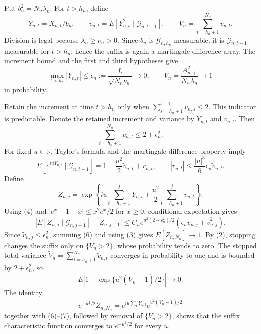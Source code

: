 Put \(b_n^2=N_n\lambda_n\). For \(t>h_n\), define
\[
 Y_{n,t}=X_{n,t}/b_n,\qquad
 v_{n,t}=E[Y_{n,t}^2\mid\mathcal G_{n,t-1}],\qquad
 V_n=\sum_{t=h_n+1}^{N_n}v_{n,t}.
\tag{1}
\]
Division is legal because \(\lambda_n\ge\nu_n>0\). Since \(b_n\) is \(\mathcal G_{n,h_n}\)-measurable, it is \(\mathcal G_{n,t-1}\)-measurable for \(t>h_n\); hence the suffix is again a martingale-difference array. The increment bound and the first and third hypotheses give
\[
 \max_{t>h_n}|Y_{n,t}|
 \le\epsilon_n:=\frac{L}{\sqrt{N_n\nu_n}}\longrightarrow0,
 \qquad V_n=\frac{A_{n,+}^2}{N_n\lambda_n}\longrightarrow1
\tag{2}
\]
in probability.

Retain the increment at time \(t>h_n\) only when \(\sum_{s=h_n+1}^{t-1}v_{n,s}\le2\). This indicator is predictable. Denote the retained increment and variance by \(\widetilde Y_{n,t}\) and \(\widetilde v_{n,t}\). Then
\[
 \sum_{t=h_n+1}^{N_n}\widetilde v_{n,t}\le2+\epsilon_n^2.
\tag{3}
\]
For fixed \(u\in\mathbb R\), Taylor's formula and the martingale-difference property imply
\[
 E[e^{iu\widetilde Y_{n,t}}\mid\mathcal G_{n,t-1}]
 =1-\frac{u^2}{2}\widetilde v_{n,t}+r_{n,t},
 \qquad |r_{n,t}|\le\frac{|u|^3}{6}\epsilon_n\widetilde v_{n,t}.
\tag{4}
\]
Define
\[
 Z_{n,j}=\exp\!\left\{iu\sum_{t=h_n+1}^j\widetilde Y_{n,t}
 +\frac{u^2}{2}\sum_{t=h_n+1}^j\widetilde v_{n,t}\right\}.
\tag{5}
\]
Using (4) and \(|e^x-1-x|\le x^2e^x/2\) for \(x\ge0\), conditional expectation gives
\[
 \left|E[Z_{n,j}\mid\mathcal G_{n,j-1}]-Z_{n,j-1}\right|
 \le C_u e^{u^2(2+\epsilon_n^2)/2}
 \left(\epsilon_n\widetilde v_{n,j}+\widetilde v_{n,j}^2\right).
\tag{6}
\]
Since \(\widetilde v_{n,j}\le\epsilon_n^2\), summing (6) and using (3) gives \(E[Z_{n,N_n}]\to1\). By (2), stopping changes the suffix only on \(\{V_n>2\}\), whose probability tends to zero. The stopped total variance \(\widetilde V_n=\sum_{t=h_n+1}^{N_n}\widetilde v_{n,t}\) converges in probability to one and is bounded by \(2+\epsilon_n^2\), so
\[
 E\left|1-\exp\{u^2(\widetilde V_n-1)/2\}\right|\longrightarrow0.
\tag{7}
\]
The identity
\[
 e^{-u^2/2}Z_{n,N_n}
 =e^{iu\sum_t\widetilde Y_{n,t}}
 e^{u^2(\widetilde V_n-1)/2}
\]
together with (6)--(7), followed by removal of \(\{V_n>2\}\), shows that the suffix characteristic function converges to \(e^{-u^2/2}\) for every \(u\).

